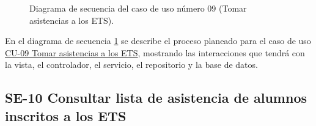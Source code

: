 \begin{figure}[htbp!]
	\begin{center}
		\caption{Diagrama de secuencia del caso de uso número 09 (Tomar asistencias a los ETS).}
		\label{fig:Diagrama de secuencia CU-09}
	\end{center}
\end{figure}

En el diagrama de secuencia \ref{fig:Diagrama de secuencia CU-09} se describe el proceso planeado para el caso de uso \hyperlink{CU-09}{CU-09 Tomar asistencias a los ETS}, mostrando las interacciones que tendrá con la vista, el controlador, el servicio, el repositorio y la base de datos.

\subsection{SE-10 Consultar lista de asistencia de alumnos inscritos a los ETS}

